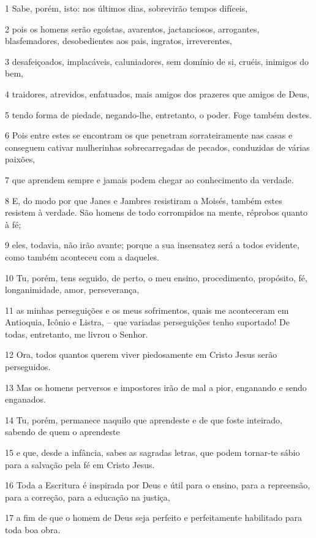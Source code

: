 \par 1 Sabe, porém, isto: nos últimos dias, sobrevirão tempos difíceis,
\par 2 pois os homens serão egoístas, avarentos, jactanciosos, arrogantes, blasfemadores, desobedientes aos pais, ingratos, irreverentes,
\par 3 desafeiçoados, implacáveis, caluniadores, sem domínio de si, cruéis, inimigos do bem,
\par 4 traidores, atrevidos, enfatuados, mais amigos dos prazeres que amigos de Deus,
\par 5 tendo forma de piedade, negando-lhe, entretanto, o poder. Foge também destes.
\par 6 Pois entre estes se encontram os que penetram sorrateiramente nas casas e conseguem cativar mulherinhas sobrecarregadas de pecados, conduzidas de várias paixões,
\par 7 que aprendem sempre e jamais podem chegar ao conhecimento da verdade.
\par 8 E, do modo por que Janes e Jambres resistiram a Moisés, também estes resistem à verdade. São homens de todo corrompidos na mente, réprobos quanto à fé;
\par 9 eles, todavia, não irão avante; porque a sua insensatez será a todos evidente, como também aconteceu com a daqueles.
\par 10 Tu, porém, tens seguido, de perto, o meu ensino, procedimento, propósito, fé, longanimidade, amor, perseverança,
\par 11 as minhas perseguições e os meus sofrimentos, quais me aconteceram em Antioquia, Icônio e Listra, -- que variadas perseguições tenho suportado! De todas, entretanto, me livrou o Senhor.
\par 12 Ora, todos quantos querem viver piedosamente em Cristo Jesus serão perseguidos.
\par 13 Mas os homens perversos e impostores irão de mal a pior, enganando e sendo enganados.
\par 14 Tu, porém, permanece naquilo que aprendeste e de que foste inteirado, sabendo de quem o aprendeste
\par 15 e que, desde a infância, sabes as sagradas letras, que podem tornar-te sábio para a salvação pela fé em Cristo Jesus.
\par 16 Toda a Escritura é inspirada por Deus e útil para o ensino, para a repreensão, para a correção, para a educação na justiça,
\par 17 a fim de que o homem de Deus seja perfeito e perfeitamente habilitado para toda boa obra.

